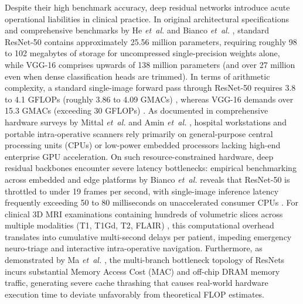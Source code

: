 Despite their high benchmark accuracy, deep residual networks introduce acute operational liabilities in clinical practice. In original architectural specifications and comprehensive benchmarks by He \emph{et~al.} \cite{14} and Bianco \emph{et~al.} \cite{60}, standard ResNet-50 contains approximately 25.56 million parameters, requiring roughly 98 to 102 megabytes of storage for uncompressed single-precision weights alone, while VGG-16 \cite{39} comprises upwards of 138 million parameters (and over 27 million even when dense classification heads are trimmed). In terms of arithmetic complexity, a standard single-image forward pass through ResNet-50 requires 3.8 to 4.1 GFLOPs (roughly 3.86 to 4.09 GMACs) \cite{14, 60}, whereas VGG-16 demands over 15.3 GMACs (exceeding 30 GFLOPs) \cite{39, 60}. As documented in comprehensive hardware surveys by Mittal \emph{et~al.} \cite{33} and Amin \emph{et~al.} \cite{56}, hospital workstations and portable intra-operative scanners rely primarily on general-purpose central processing units (CPUs) or low-power embedded processors lacking high-end enterprise GPU acceleration. On such resource-constrained hardware, deep residual backbones encounter severe latency bottlenecks: empirical benchmarking across embedded and edge platforms by Bianco \emph{et~al.} \cite{60} reveals that ResNet-50 is throttled to under 19 frames per second, with single-image inference latency frequently exceeding 50 to 80 milliseconds on unaccelerated consumer CPUs \cite{33, 60, 61}. For clinical 3D MRI examinations containing hundreds of volumetric slices across multiple modalities (T1, T1Gd, T2, FLAIR) \cite{2, 28}, this computational overhead translates into cumulative multi-second delays per patient, impeding emergency neuro-triage and interactive intra-operative navigation. Furthermore, as demonstrated by Ma \emph{et~al.} \cite{32}, the multi-branch bottleneck topology of ResNets incurs substantial Memory Access Cost (MAC) and off-chip DRAM memory traffic, generating severe cache thrashing that causes real-world hardware execution time to deviate unfavorably from theoretical FLOP estimates.

